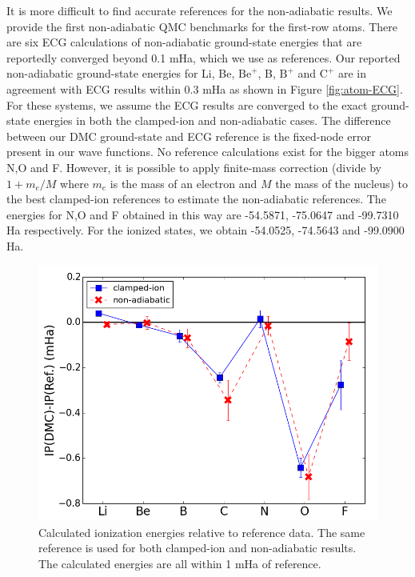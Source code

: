 \documentclass[pra,superscriptaddress,groupedaddress,twocolumn]{revtex4}
\begin{document}
It is more difficult to find accurate references for the non-adiabatic results. We provide the first non-adiabatic QMC benchmarks for the first-row atoms. There are six ECG calculations of non-adiabatic ground-state energies that are reportedly converged beyond 0.1 mHa, which we use as references. Our reported non-adiabatic ground-state energies for Li, Be, $\text{Be}^+$, B, $\text{B}^+$ and $\text{C}^+$ are in agreement with ECG results within 0.3 mHa as shown in Figure \ref{fig:atom-ECG}. For these systems, we assume the ECG results are converged to the exact ground-state energies in both the clamped-ion and non-adiabatic cases. The difference between our DMC ground-state and ECG reference is the fixed-node error present in our wave functions. No reference calculations exist for the bigger atoms N,O and F. However, it is possible to apply finite-mass correction (divide by $1+m_e/M$ where $m_e$ is the mass of an electron and $M$ the mass of the nucleus) to the best clamped-ion references to estimate the non-adiabatic references. The energies for N,O and F obtained in this way are -54.5871, -75.0647 and -99.7310 Ha respectively. For the ionized states, we obtain -54.0525, -74.5643 and -99.0900 Ha. %

\begin{figure}[h]
\centering
\includegraphics[scale=.37]{Figures/ionization}
\caption{Calculated ionization energies relative to reference data. The same reference is used for both clamped-ion and non-adiabatic results. The calculated energies are all within 1 mHa of reference. \label{fig:ionization}}
\end{figure}
\end{document}
